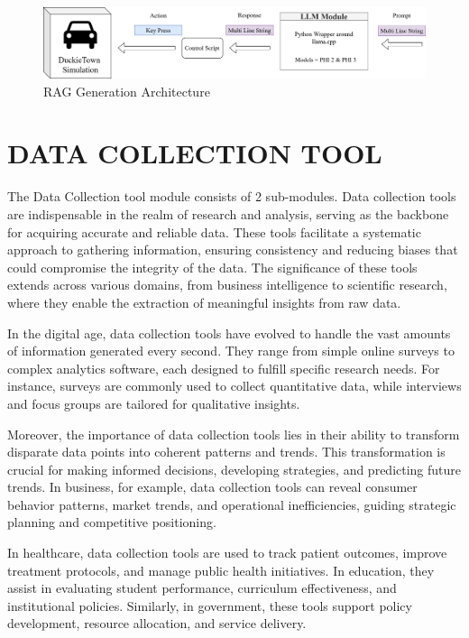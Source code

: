 \begin{spacing}{1.5}
\begin{sloppypar}
\begin{figure}
\begin{center}
\includegraphics[scale=0.28]{3/rag generation.png}
\caption{RAG Generation Architecture}
\label{fig:rag_generation}
\end{center}
\end{figure}



\section{DATA COLLECTION TOOL}
The Data Collection tool module consists of 2 sub-modules. 
Data collection tools are indispensable in the realm of research and analysis, serving as the backbone for acquiring accurate and reliable data. These tools facilitate a systematic approach to gathering information, ensuring consistency and reducing biases that could compromise the integrity of the data. The significance of these tools extends across various domains, from business intelligence to scientific research, where they enable the extraction of meaningful insights from raw data. 

In the digital age, data collection tools have evolved to handle the vast amounts of information generated every second. They range from simple online surveys to complex analytics software, each designed to fulfill specific research needs. For instance, surveys are commonly used to collect quantitative data, while interviews and focus groups are tailored for qualitative insights. 

Moreover, the importance of data collection tools lies in their ability to transform disparate data points into coherent patterns and trends. This transformation is crucial for making informed decisions, developing strategies, and predicting future trends. In business, for example, data collection tools can reveal consumer behavior patterns, market trends, and operational inefficiencies, guiding strategic planning and competitive positioning.

In healthcare, data collection tools are used to track patient outcomes, improve treatment protocols, and manage public health initiatives. In education, they assist in evaluating student performance, curriculum effectiveness, and institutional policies. Similarly, in government, these tools support policy development, resource allocation, and service delivery.


\end{sloppypar}
\end{spacing}
